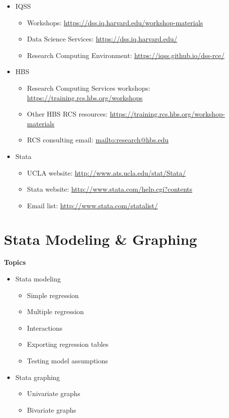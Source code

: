 \documentclass[]{book}
\providecommand{\tightlist}{%
  \setlength{\itemsep}{0pt}\setlength{\parskip}{0pt}}
\begin{document}
\begin{itemize}
\tightlist
\item
  IQSS

  \begin{itemize}
  \tightlist
  \item
    Workshops: \url{https://dss.iq.harvard.edu/workshop-materials}
  \item
    Data Science Services: \url{https://dss.iq.harvard.edu/}
  \item
    Research Computing Environment: \url{https://iqss.github.io/dss-rce/}
  \end{itemize}
\item
  HBS

  \begin{itemize}
  \tightlist
  \item
    Research Computing Services workshops: \url{https://training.rcs.hbs.org/workshops}
  \item
    Other HBS RCS resources: \url{https://training.rcs.hbs.org/workshop-materials}
  \item
    RCS consulting email: \url{mailto:research@hbs.edu}
  \end{itemize}
\item
  Stata

  \begin{itemize}
  \tightlist
  \item
    UCLA website: \url{http://www.ats.ucla.edu/stat/Stata/}
  \item
    Stata website: \url{http://www.stata.com/help.cgi?contents}
  \item
    Email list: \url{http://www.stata.com/statalist/}
  \end{itemize}
\end{itemize}

\hypertarget{stata-modeling-graphing}{%
\chapter{Stata Modeling \& Graphing}\label{stata-modeling-graphing}}

\textbf{Topics}

\begin{itemize}
\tightlist
\item
  Stata modeling

  \begin{itemize}
  \tightlist
  \item
    Simple regression
  \item
    Multiple regression
  \item
    Interactions
  \item
    Exporting regression tables
  \item
    Testing model assumptions
  \end{itemize}
\item
  Stata graphing

  \begin{itemize}
  \tightlist
  \item
    Univariate graphs
  \item
    Bivariate graphs
  \end{itemize}
\end{itemize}
\end{document}
